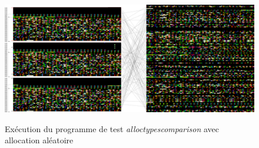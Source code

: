 \documentclass{article}
\begin{document}
\begin{figure}[h]
    \caption{Exécution du programme de test \textit{alloctypescomparison} avec allocation aléatoire}
    \centering
    \includegraphics[width=\textwidth,height=\textheight,keepaspectratio]{memory_random}
    \label{fig:alloc_random}
\end{figure}
\end{document}
